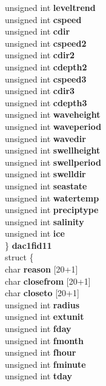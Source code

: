 \begin{DoxyCompactItemize}
{\begin{tabbing}
{\>\>\>\>unsigned int {\bfseries leveltrend}\\
\>\>\>\>unsigned int {\bfseries cspeed}\\
\>\>\>\>unsigned int {\bfseries cdir}\\
\>\>\>\>unsigned int {\bfseries cspeed2}\\
\>\>\>\>unsigned int {\bfseries cdir2}\\
\>\>\>\>unsigned int {\bfseries cdepth2}\\
\>\>\>\>unsigned int {\bfseries cspeed3}\\
\>\>\>\>unsigned int {\bfseries cdir3}\\
\>\>\>\>unsigned int {\bfseries cdepth3}\\
\>\>\>\>unsigned int {\bfseries waveheight}\\
\>\>\>\>unsigned int {\bfseries waveperiod}\\
\>\>\>\>unsigned int {\bfseries wavedir}\\
\>\>\>\>unsigned int {\bfseries swellheight}\\
\>\>\>\>unsigned int {\bfseries swellperiod}\\
\>\>\>\>unsigned int {\bfseries swelldir}\\
\>\>\>\>unsigned int {\bfseries seastate}\\
\>\>\>\>unsigned int {\bfseries watertemp}\\
\>\>\>\>unsigned int {\bfseries preciptype}\\
\>\>\>\>unsigned int {\bfseries salinity}\\
\>\>\>\>unsigned int {\bfseries ice}\\
\>\>\>\} {\bfseries dac1fid11}\\
\>\>\>struct \{\\
\>\>\>\>char {\bfseries reason} \mbox{[}20+1\mbox{]}\\
\>\>\>\>char {\bfseries closefrom} \mbox{[}20+1\mbox{]}\\
\>\>\>\>char {\bfseries closeto} \mbox{[}20+1\mbox{]}\\
\>\>\>\>unsigned int {\bfseries radius}\\
\>\>\>\>unsigned int {\bfseries extunit}\\
\>\>\>\>unsigned int {\bfseries fday}\\
\>\>\>\>unsigned int {\bfseries fmonth}\\
\>\>\>\>unsigned int {\bfseries fhour}\\
\>\>\>\>unsigned int {\bfseries fminute}\\
\>\>\>\>unsigned int {\bfseries tday}\\
}
\end{tabbing}}
\end{DoxyCompactItemize}
